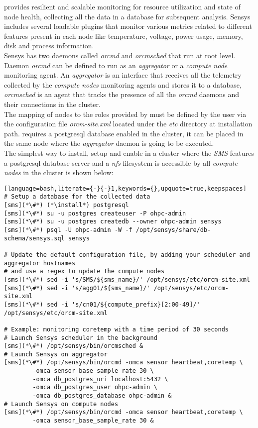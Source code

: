 \Sensys{} provides resilient and scalable monitoring for resource utilization
and state of node health, collecting all the data in a database for subsequent
analysis. Sensys includes several loadable plugins that monitor various metrics
related to different features present in each node like temperature, voltage,
power usage, memory, disk and process information.\\

\noindent Sensys has two daemons called {\em orcmd} and {\em orcmsched} that run
at root level. Daemon {\em orcmd} can be defined to run as an {\em aggregator}
or a {\em compute node} monitoring agent.
An {\em aggregator} is an interface that receives all the telemetry collected by
the {\em compute nodes} monitoring agents and stores it to a database, {\em
orcmsched} is an agent that tracks the presence of all the {\em orcmd} daemons
and their connections in the cluster.\\
The mapping of nodes to the roles provided by \Sensys{} must be defined by the
user via the configuration file {\em orcm-site.xml} located under the {\em etc}
directory at \Sensys{} installation path.
\Sensys{} requires a postgresql database enabled in the cluster, it can be
placed in the same node where the {\em aggregator} daemon is going to be
executed. \\

\noindent The simplest way to install, setup and enable \Sensys{} in a cluster
where the {\em SMS} features a postgresql database server and a {\em nfs}
filesystem is accessible by all {\em compute nodes} in the cluster is shown
below:

\begin{lstlisting}[language=bash,literate={-}{-}1,keywords={},upquote=true,keepspaces]
# Setup a database for the collected data
[sms](*\#*) (*\install*) postgresql
[sms](*\#*) su -u postgres createuser -P ohpc-admin
[sms](*\#*) su -u postgres createdb --owner ohpc-admin sensys
[sms](*\#*) psql -U ohpc-admin -W -f /opt/sensys/share/db-schema/sensys.sql sensys

# Update the default configuration file, by adding your scheduler and aggregator hostnames
# and use a regex to update the compute nodes
[sms](*\#*) sed -i 's/SMS/${sms_name}/' /opt/sensys/etc/orcm-site.xml
[sms](*\#*) sed -i 's/agg01/${sms_name}/' /opt/sensys/etc/orcm-site.xml
[sms](*\#*) sed -i 's/cn01/${compute_prefix}[2:00-49]/' /opt/sensys/etc/orcm-site.xml

# Example: monitoring coretemp with a time period of 30 seconds
# Launch Sensys scheduler in the background
[sms](*\#*) /opt/sensys/bin/orcmsched &
# Launch Sensys on aggregator
[sms](*\#*) /opt/sensys/bin/orcmd -omca sensor heartbeat,coretemp \
        -omca sensor_base_sample_rate 30 \
        -omca db_postgres_uri localhost:5432 \
        -omca db_postgres_user ohpc-admin \
        -omca db_postgres_database ohpc-admin &
# Launch Sensys on compute nodes
[sms](*\#*) /opt/sensys/bin/orcmd -omca sensor heartbeat,coretemp \
        -omca sensor_base_sample_rate 30 &
\end{lstlisting}

